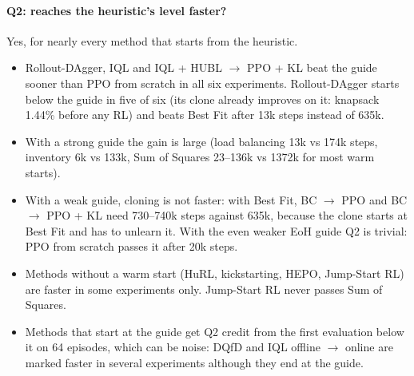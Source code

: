 \documentclass[11pt,a4paper]{article}
\begin{document}
\paragraph{Q2: reaches the heuristic's level faster?} Yes, for nearly every method that starts from the heuristic.
\begin{itemize}[leftmargin=*]
\item Rollout-DAgger, IQL and IQL + HUBL $\to$ PPO + KL beat the guide sooner than PPO from scratch in all six
  experiments. Rollout-DAgger starts below the guide in five of six (its clone already improves on it: knapsack
  1.44\% before any RL) and beats Best Fit after 13k steps instead of 635k.
\item With a strong guide the gain is large (load balancing 13k vs 174k steps, inventory 6k vs 133k, Sum of Squares
  23--136k vs 1372k for most warm starts).
\item With a weak guide, cloning is not faster: with Best Fit, BC $\to$ PPO and BC $\to$ PPO + KL need 730--740k
  steps against 635k, because the clone starts at Best Fit and has to unlearn it. With the even weaker EoH guide Q2 is
  trivial: PPO from scratch passes it after 20k steps.
\item Methods without a warm start (HuRL, kickstarting, HEPO, Jump-Start RL) are faster in some experiments only.
  Jump-Start RL never passes Sum of Squares.
\item Methods that start at the guide get Q2 credit from the first evaluation below it on 64 episodes, which can be
  noise: DQfD and IQL offline $\to$ online are marked faster in several experiments although they end at the guide.
\end{itemize}
\end{document}
